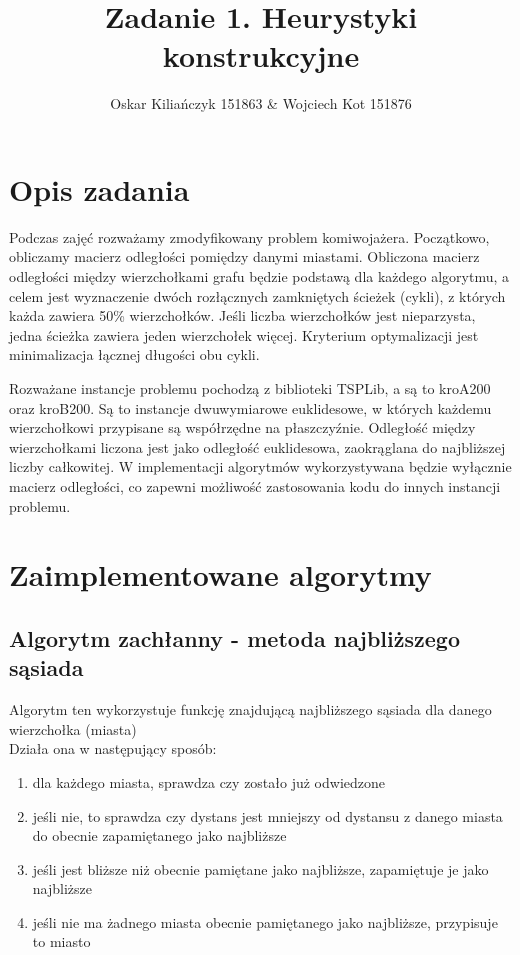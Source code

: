 \documentclass[11pt]{article}
\title{Zadanie 1. Heurystyki konstrukcyjne}
\author{Oskar Kiliańczyk 151863 \& Wojciech Kot 151876}
\date{}
\begin{document}
\maketitle
\newpage

\section{Opis zadania}\label{sec:opis-zadania}

Podczas zajęć rozważamy zmodyfikowany problem komiwojażera.
Początkowo, obliczamy macierz odległości pomiędzy danymi miastami.
Obliczona macierz odległości między wierzchołkami grafu będzie podstawą dla każdego algorytmu,
a celem jest wyznaczenie dwóch rozłącznych zamkniętych ścieżek (cykli), z których każda zawiera 50\% wierzchołków.
Jeśli liczba wierzchołków jest nieparzysta, jedna ścieżka zawiera jeden wierzchołek więcej.
Kryterium optymalizacji jest minimalizacja łącznej długości obu cykli.

Rozważane instancje problemu pochodzą z biblioteki TSPLib, a są to kroA200 oraz kroB200.
Są to instancje dwuwymiarowe euklidesowe, w których każdemu wierzchołkowi przypisane są współrzędne na płaszczyźnie.
Odległość między wierzchołkami liczona jest jako odległość euklidesowa, zaokrąglana do najbliższej liczby całkowitej.
W implementacji algorytmów wykorzystywana będzie wyłącznie macierz odległości, co zapewni możliwość zastosowania kodu do innych instancji problemu.

\section{Zaimplementowane algorytmy}\label{sec:zaimplementowane-algorytmy}

\subsection{Algorytm zachłanny - metoda najbliższego sąsiada}\label{subsec:algorytm-zachanny---metoda-najblizszego-sasiada}

Algorytm ten wykorzystuje funkcję znajdującą najbliższego sąsiada dla danego wierzchołka (miasta) \\
Działa ona w następujący sposób: \\
\begin{enumerate}
\item dla każdego miasta, sprawdza czy zostało już odwiedzone \\
\item jeśli nie, to sprawdza czy dystans jest mniejszy od dystansu z danego miasta do obecnie zapamiętanego jako najbliższe \\
\item jeśli jest bliższe niż obecnie pamiętane jako najbliższe, zapamiętuje je jako najbliższe \\
\item jeśli nie ma żadnego miasta obecnie pamiętanego jako najbliższe, przypisuje to miasto \\
\end{enumerate}
\end{document}
